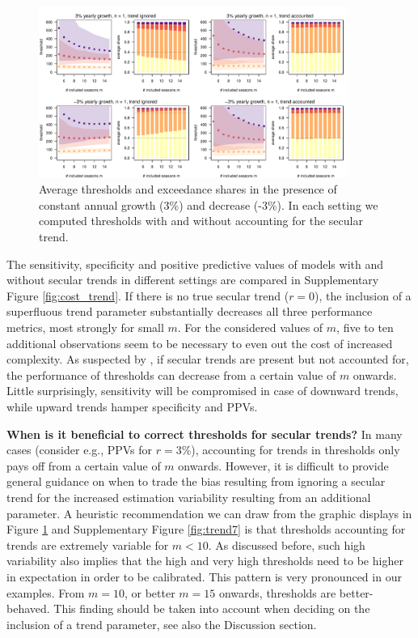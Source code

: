 \documentclass[12pt]{article}
\begin{document}
\begin{figure}
\begin{center}
\includegraphics[width = 0.9\textwidth]{figure/plot_trend3_fr_small.pdf}
\end{center}
\caption{Average thresholds and exceedance shares in the presence of constant annual growth (3\%) and decrease (-3\%). In each setting we computed thresholds with and without accounting for the secular trend.}
\label{fig:trend}
\end{figure}

The sensitivity, specificity and positive predictive values of models with and without secular trends in different settings are compared in Supplementary Figure \ref{fig:cost_trend}. If there is no true secular trend ($r = 0$), the inclusion of a superfluous trend parameter substantially decreases all three performance metrics, most strongly for small $m$. For the considered values of $m$, five to ten additional observations seem to be necessary to even out the cost of increased complexity. As suspected by \cite{Vega2013}, if secular trends are present but not accounted for, the performance of thresholds can decrease from a certain value of $m$ onwards. Little surprisingly, sensitivity will be compromised in case of downward trends, while upward trends hamper specificity and PPVs.

\noindent \textbf{When is it beneficial to correct thresholds for secular trends?} In many cases (consider e.g., PPVs for $r = 3\%$), accounting for trends in thresholds only pays off from a certain value of $m$ onwards. However, it is difficult to provide general guidance on when to trade the bias resulting from ignoring a secular trend for the increased estimation variability resulting from an additional parameter. A heuristic recommendation we can draw from the graphic displays in Figure \ref{fig:trend} and Supplementary Figure \ref{fig:trend7} is that thresholds accounting for trends are extremely variable for $m < 10$. As discussed before, such high variability also implies that the high and very high thresholds need to be higher in expectation in order to be calibrated. This pattern is very pronounced in our examples. From $m = 10$, or better $m = 15$ onwards, thresholds are better-behaved. This finding should be taken into account when deciding on the inclusion of a trend parameter, see also the Discussion section.
\end{document}
